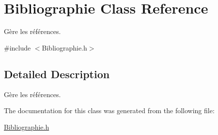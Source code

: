 \hypertarget{classBibliographie}{}\section{Bibliographie Class Reference}
\label{classBibliographie}


Gère les références.  




{\ttfamily \#include $<$Bibliographie.\+h$>$}



\subsection{Detailed Description}
Gère les références. 

The documentation for this class was generated from the following file\+:\begin{DoxyCompactItemize}
\item 
\hyperlink{Bibliographie_8h}{Bibliographie.\+h}\end{DoxyCompactItemize}
